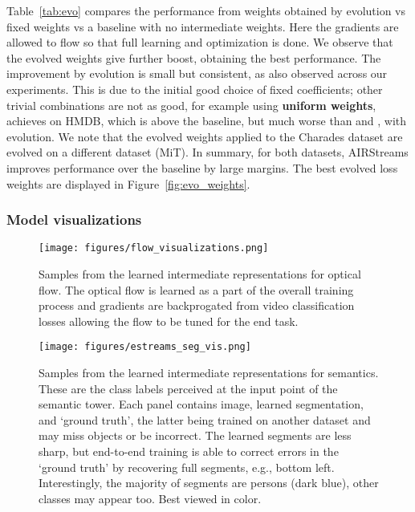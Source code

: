 \documentclass[final]{cvpr}
\begin{document}
Table~\ref{tab:evo} compares the performance from weights obtained by evolution vs fixed weights vs a baseline with no intermediate weights. Here the gradients are allowed to flow so that full learning and optimization is done.
We observe that the evolved weights give further boost, obtaining the best performance. The improvement by evolution is small but consistent, as also observed across our experiments. This is due to the initial good choice of fixed coefficients; other trivial combinations are not as good, for example using \textbf{uniform weights}, achieves  on HMDB, which is above the baseline, but much worse than  and , with evolution.
We note that the evolved weights applied to the Charades dataset are evolved on a different dataset (MiT). In summary, for both datasets, AIRStreams improves performance over the baseline by large margins. The best evolved loss weights are displayed in Figure~\ref{fig:evo_weights}.

\subsubsection{Model visualizations}

\begin{figure}
  \centering
    \texttt{[image: figures/flow\_visualizations.png]}
  \caption{Samples from the learned intermediate representations for optical flow. The optical flow is learned as a part of the overall training process and gradients are backprogated from video classification losses allowing the flow to be tuned for the end task.}
  \label{fig:interm-flow}
\end{figure}

\begin{figure}
  \centering
    \texttt{[image: figures/estreams\_seg\_vis.png]}
  \caption{Samples from the learned intermediate representations for semantics. 
  These are the class labels perceived at the input point of the semantic tower.
Each panel contains image, learned segmentation, and `ground truth', the latter being trained on another dataset and may miss objects or be incorrect. The learned segments are less sharp, but end-to-end training is able to correct errors in the `ground truth' by recovering full segments, e.g., bottom left. 
  Interestingly, the majority of segments are persons (dark blue), other classes may appear too. Best viewed in color.}
  \label{fig:interm}
\end{figure}
\end{document}
